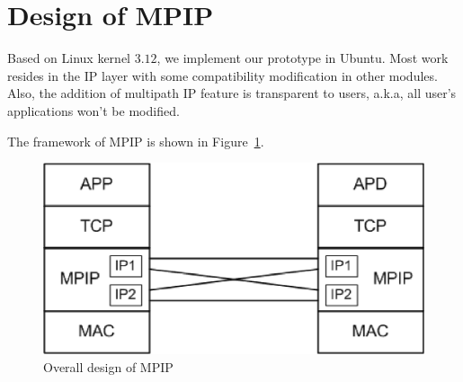 \section{Design of MPIP}
\label{sec:design}
Based on Linux kernel $3.12$, we implement our prototype in Ubuntu. Most work resides in the IP layer with some compatibility modification in other modules. Also, the addition of multipath IP feature is transparent to users, a.k.a, all user\textquoteright s applications won\textquoteright t be modified.

The framework of MPIP is shown in Figure~\ref{fig.arch}. 
\begin{figure}
\centering
\includegraphics[width=0.8\linewidth]{fig/arch.eps}
\caption{Overall design of MPIP}
\label{fig.arch}
\end{figure}

